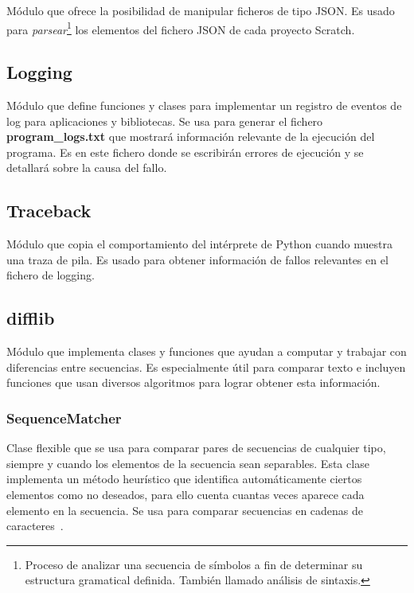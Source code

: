 \documentclass[a4paper, 12pt]{book}
\begin{document}
Módulo que ofrece la posibilidad de manipular ficheros de tipo JSON. Es usado para \textit{parsear}\footnote{Proceso de analizar una secuencia de símbolos a fin de determinar su estructura gramatical definida. También llamado análisis de sintaxis.} los elementos del fichero JSON de cada proyecto Scratch.

\subsection{Logging}
\label{sec:logging}

Módulo que define funciones y clases para implementar un registro de eventos de log para aplicaciones y bibliotecas. Se usa para generar el fichero \textbf{program\_logs.txt} que mostrará información relevante de la ejecución del programa. Es en este fichero donde se escribirán errores de ejecución y se detallará sobre la causa del fallo.

\subsection{Traceback}
\label{sec:traceback}

Módulo que copia el comportamiento del intérprete de Python cuando muestra una traza de pila. Es usado para obtener información de fallos relevantes en el fichero de logging.

\subsection{difflib}
\label{sec:difflib}

Módulo que implementa clases y funciones que ayudan a computar y trabajar con diferencias entre secuencias. Es especialmente útil para comparar texto e incluyen funciones que usan diversos algoritmos para lograr obtener esta información.

\subsubsection{SequenceMatcher}
\label{sec:difflib_SequenceMatcher} 

Clase flexible que se usa para comparar pares de secuencias de cualquier tipo, siempre y cuando los elementos de la secuencia sean separables. Esta clase implementa un método heurístico que identifica automáticamente ciertos elementos como no deseados, para ello cuenta cuantas veces aparece cada elemento en la secuencia. Se usa para comparar secuencias en cadenas de caracteres~\cite{sequenceWeb}.
\end{document}
